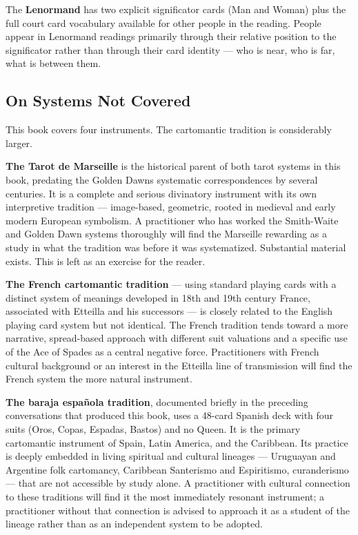 The \textbf{Lenormand} has two explicit significator cards (Man and Woman) plus the full court card vocabulary available for other people in the reading. People appear in Lenormand readings primarily through their relative position to the significator rather than through their card identity --- who is near, who is far, what is between them.

\subsection{On Systems Not Covered}\label{on-systems-not-covered}

This book covers four instruments. The cartomantic tradition is considerably larger.

\textbf{The Tarot de Marseille} is the historical parent of both tarot systems in this book, predating the Golden Dawn\textquotesingle s systematic correspondences by several centuries. It is a complete and serious divinatory instrument with its own interpretive tradition --- image-based, geometric, rooted in medieval and early modern European symbolism. A practitioner who has worked the Smith-Waite and Golden Dawn systems thoroughly will find the Marseille rewarding as a study in what the tradition was before it was systematized. Substantial material exists. This is left as an exercise for the reader.

\textbf{The French cartomantic tradition} --- using standard playing cards with a distinct system of meanings developed in 18th and 19th century France, associated with Etteilla and his successors --- is closely related to the English playing card system but not identical. The French tradition tends toward a more narrative, spread-based approach with different suit valuations and a specific use of the Ace of Spades as a central negative force. Practitioners with French cultural background or an interest in the Etteilla line of transmission will find the French system the more natural instrument.

\textbf{The baraja española tradition}, documented briefly in the preceding conversations that produced this book, uses a 48-card Spanish deck with four suits (Oros, Copas, Espadas, Bastos) and no Queen. It is the primary cartomantic instrument of Spain, Latin America, and the Caribbean. Its practice is deeply embedded in living spiritual and cultural lineages --- Uruguayan and Argentine folk cartomancy, Caribbean Santerismo and Espiritismo, curanderismo --- that are not accessible by study alone. A practitioner with cultural connection to these traditions will find it the most immediately resonant instrument; a practitioner without that connection is advised to approach it as a student of the lineage rather than as an independent system to be adopted.

